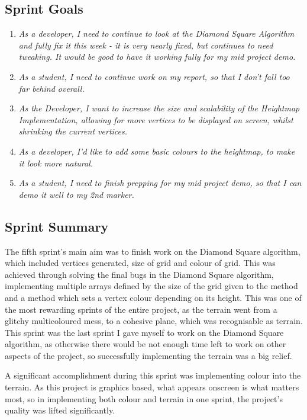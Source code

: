 \documentclass[a4paper,10pt]{report}
\begin{document}
\subsection{Sprint Goals}

\begin{enumerate}
    \item \textit{As a developer, I need to continue to look at the Diamond Square Algorithm and fully fix it this week - it is very nearly fixed, but continues to need tweaking. It would be good to have it working fully for my mid project demo. }
    \item \textit{As a student, I need to continue work on my report, so that I don't fall too far behind overall.}
    \item \textit{As the Developer, I want to increase the size and scalability of the Heightmap Implementation, allowing for more vertices to be displayed on screen, whilst shrinking the current vertices. }
    \item \textit{As a developer, I'd like to add some basic colours to the heightmap, to make it look more natural.}
    \item \textit{As a student, I need to finish prepping for my mid project demo, so that I can demo it well to my 2nd marker. }
    
\end{enumerate}
\subsection{Sprint Summary}

The fifth sprint's main aim was to finish work on the Diamond Square algorithm, which included vertices generated, size of grid and colour of grid. This was achieved through solving the final bugs in the Diamond Square algorithm, implementing multiple arrays defined by the size of the grid given to the method and a method which sets a vertex colour depending on its height. This was one of the most rewarding sprints of the entire project, as the terrain went from a glitchy multicoloured mess, to a cohesive plane, which was recognisable as terrain. This sprint was the last sprint I gave myself to work on the Diamond Square algorithm, as otherwise there would be not enough time left to work on other aspects of the project, so successfully implementing the terrain was a big relief. \medskip

A significant accomplishment during this sprint was implementing colour into the terrain. As this project is graphics based, what appears onscreen is what matters most, so in implementing both colour and terrain in one sprint, the project's quality was lifted significantly.
\end{document}
